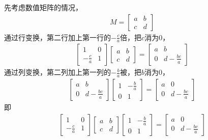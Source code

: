 \documentclass{article}
\begin{document}
先考虑数值矩阵的情况，
\begin{align*}
  M = \begin{bmatrix}
        a & b \\
        c & d
      \end{bmatrix}
\end{align*}
通过行变换，第二行加上第一行的$-\frac{c}{a}$倍，把$c$消为0，
\begin{align*}
  \begin{bmatrix}
    1            & 0 \\
    -\frac{c}{a} & 1
  \end{bmatrix}
  \begin{bmatrix}
    a & b \\
    c & d
  \end{bmatrix}
  =
  \begin{bmatrix}
    a & b                \\
    0 & d - \frac{bc}{a}
  \end{bmatrix}
\end{align*}
通过列变换，第二列加上第一列的$-\frac{b}{a}$被，把$b$消为0，
\begin{align*}
  \begin{bmatrix}
    a & b                \\
    0 & d - \frac{bc}{a}
  \end{bmatrix}
  \begin{bmatrix}
    1 & - \frac{b}{a} \\
    0 & 1
  \end{bmatrix}
  = \begin{bmatrix}
      a & 0                \\
      0 & d - \frac{bc}{a}
    \end{bmatrix}
\end{align*}
即
\begin{align*}
  \begin{bmatrix}
    1            & 0 \\
    -\frac{c}{a} & 1
  \end{bmatrix}
  \begin{bmatrix}
    a & b \\
    c & d
  \end{bmatrix}
  \begin{bmatrix}
    1 & - \frac{b}{a} \\
    0 & 1
  \end{bmatrix}
  = \begin{bmatrix}
      a & 0                \\
      0 & d - \frac{bc}{a}
    \end{bmatrix}
\end{align*}
\end{document}
